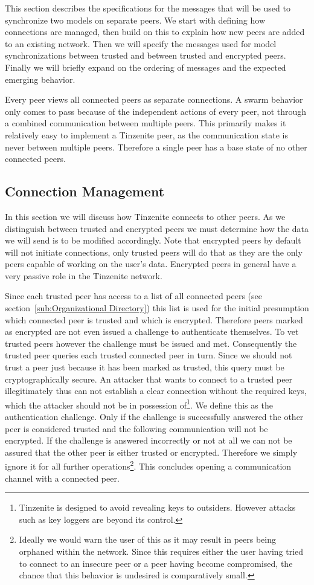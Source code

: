 This section describes the specifications for the messages that will be used to synchronize two models on separate peers.
We start with defining how connections are managed, then build on this to explain how new peers are added to an existing network.
Then we will specify the messages used for model synchronizations between trusted and between trusted and encrypted peers.
Finally we will briefly expand on the ordering of messages and the expected emerging behavior.

Every peer views all connected peers as separate connections.
A swarm behavior only comes to pass because of the independent actions of every peer, not through a combined communication between multiple peers.
This primarily makes it relatively easy to implement a Tinzenite peer, as the communication state is never between multiple peers.
Therefore a single peer has a base state of no other connected peers.

\subsection{Connection Management}
\label{sec:conn_management}

In this section we will discuss how Tinzenite connects to other peers.
As we distinguish between trusted and encrypted peers we must determine how the data we will send is to be modified accordingly.
Note that encrypted peers by default will not initiate connections, only trusted peers will do that as they are the only peers capable of working on the user's data.
Encrypted peers in general have a very passive role in the Tinzenite network.

Since each trusted peer has access to a list of all connected peers (see section~\ref{sub:Organizational Directory}) this list is used for the initial presumption which connected peer is trusted and which is encrypted.
Therefore peers marked as encrypted are not even issued a challenge to authenticate themselves.
To vet trusted peers however the challenge must be issued and met.
Consequently the trusted peer queries each trusted connected peer in turn.
Since we should not trust a peer just because it has been marked as trusted, this query must be cryptographically secure.
An attacker that wants to connect to a trusted peer illegitimately thus can not establish a clear connection without the required keys, which the attacker should not be in possession of\footnote{Tinzenite is designed to avoid revealing keys to outsiders. However attacks such as key loggers are beyond its control.}.
We define this as the authentication challenge.
Only if the challenge is successfully answered the other peer is considered trusted and the following communication will not be encrypted.
If the challenge is answered incorrectly or not at all we can not be assured that the other peer is either trusted or encrypted.
Therefore we simply ignore it for all further operations\footnote{Ideally we would warn the user of this as it may result in peers being orphaned within the network. Since this requires either the user having tried to connect to an insecure peer or a peer having become compromised, the chance that this behavior is undesired is comparatively small.}.
This concludes opening a communication channel with a connected peer.

